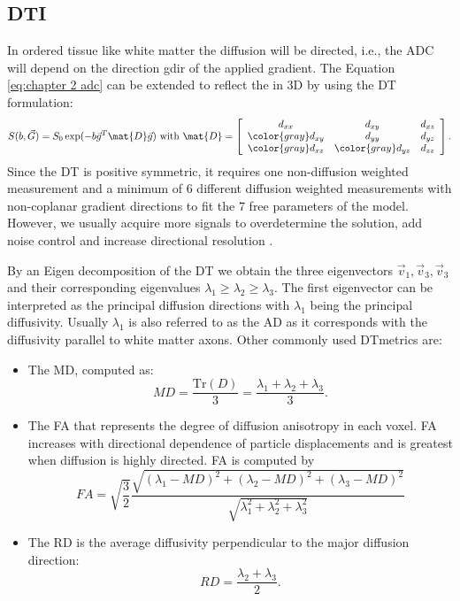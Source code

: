 \subsection*{{\protect\acrlong{DTI}}}
\label{subsec:dti}
In ordered tissue like white matter the diffusion will be directed, i.e., the \gls{ADC} will depend on the direction {\gls{gdir}} of the applied gradient. The Equation \ref{eq:chapter 2 adc} can be extended to reflect the in 3D by using the {\gls{DT}} formulation:
\begin{equation}
	S(b,\vec{G}) = S_{0}\exp(-b\vec{g}^T \mat{D}\vec{g}) \mbox{ with } \mat{D} = 
	\left[
	\begin{array}{ccc}
	d_{xx} & d_{xy} & d_{xz} \\
	{\color{gray} d_{xy}} & d_{yy} & d_{yz} \\
	{\color{gray} d_{xz}} & {\color{gray} d_{yz}} & d_{zz} 	
	\end{array} \right].	
    \label{eq:dti}
\end{equation}
Since the {\gls{DT}} is positive symmetric, it requires one non-diffusion weighted measurement and a minimum of 6 different diffusion weighted measurements with non-coplanar gradient directions to fit the 7 free parameters of the model. However, we usually acquire more signals to overdetermine the solution, add noise control and increase directional resolution \citep{Jones:2004a}.

By an Eigen decomposition of the {\gls{DT}} we obtain the three eigenvectors $\vec{v}_1, \vec{v}_3, \vec{v}_3$ and their corresponding eigenvalues $\lambda_1\ge\lambda_2\ge\lambda_3$. The first eigenvector can be interpreted as the principal diffusion directions with $\lambda_1$ being the principal diffusivity. Usually $\lambda_1$ is also referred to as the {\gls{AD}} as it corresponds with the diffusivity parallel to white matter axons\citep{Basser:1996}. Other commonly used {\gls{DT}}metrics are:
\begin{itemize}
	\item The {\gls{MD}}, computed as:
	\begin{equation}
		MD = \frac{\mbox{Tr}(D)}{3} = \frac{\lambda_1 + \lambda_2 +\lambda_3}{3}.
	\end{equation}
	\item The {\gls{FA}} that represents the degree of diffusion anisotropy in each voxel.  {\gls{FA}} increases
	with directional dependence of particle displacements and is greatest when diffusion is highly directed.  {\gls{FA}} is computed by
	\begin{equation}
		FA = \sqrt{\frac{3}{2}}\frac{\sqrt{(\lambda_1-MD)^2+(\lambda_2-MD)^2+(\lambda_3-MD)^2}}{\sqrt{\lambda_1^2+\lambda_2^2+\lambda_3^2}}
	\end{equation}
	\item The {\gls{RD}} is the average diffusivity perpendicular to the major diffusion direction:
	\begin{equation}
		RD = \frac{\lambda_2 + \lambda_3}{2}.
	\end{equation}
\end{itemize}


